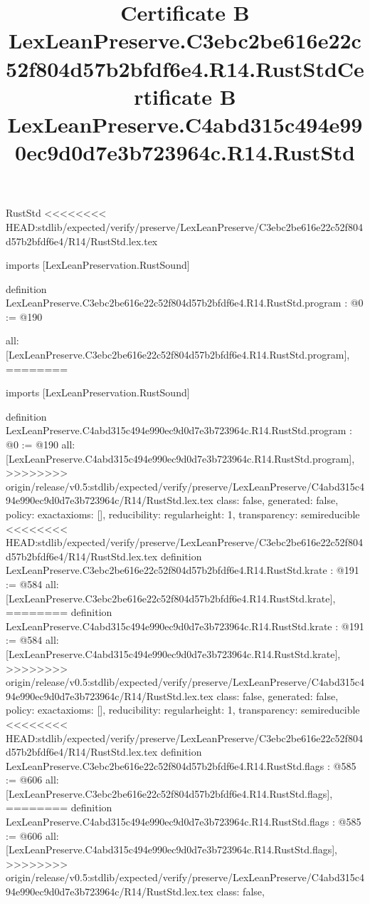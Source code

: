 \begin{lexlean}{RustStd}
<<<<<<<< HEAD:stdlib/expected/verify/preserve/LexLeanPreserve/C3ebc2be616e22c52f804d57b2bfdf6e4/R14/RustStd.lex.tex
\title{Certificate B LexLeanPreserve.C3ebc2be616e22c52f804d57b2bfdf6e4.R14.RustStd}
\begin{coremodule}
imports [LexLeanPreservation.RustSound]

definition LexLeanPreserve.C3ebc2be616e22c52f804d57b2bfdf6e4.R14.RustStd.program : @0 := @190 {
  all: [LexLeanPreserve.C3ebc2be616e22c52f804d57b2bfdf6e4.R14.RustStd.program],
========
\title{Certificate B LexLeanPreserve.C4abd315c494e990ec9d0d7e3b723964c.R14.RustStd}
\begin{coremodule}
imports [LexLeanPreservation.RustSound]

definition LexLeanPreserve.C4abd315c494e990ec9d0d7e3b723964c.R14.RustStd.program : @0 := @190 {
  all: [LexLeanPreserve.C4abd315c494e990ec9d0d7e3b723964c.R14.RustStd.program],
>>>>>>>> origin/release/v0.5:stdlib/expected/verify/preserve/LexLeanPreserve/C4abd315c494e990ec9d0d7e3b723964c/R14/RustStd.lex.tex
  class: false,
  generated: false,
  policy: exact{axioms: []},
  reducibility: regular{height: 1},
  transparency: semireducible
}
<<<<<<<< HEAD:stdlib/expected/verify/preserve/LexLeanPreserve/C3ebc2be616e22c52f804d57b2bfdf6e4/R14/RustStd.lex.tex
definition LexLeanPreserve.C3ebc2be616e22c52f804d57b2bfdf6e4.R14.RustStd.krate : @191 := @584 {
  all: [LexLeanPreserve.C3ebc2be616e22c52f804d57b2bfdf6e4.R14.RustStd.krate],
========
definition LexLeanPreserve.C4abd315c494e990ec9d0d7e3b723964c.R14.RustStd.krate : @191 := @584 {
  all: [LexLeanPreserve.C4abd315c494e990ec9d0d7e3b723964c.R14.RustStd.krate],
>>>>>>>> origin/release/v0.5:stdlib/expected/verify/preserve/LexLeanPreserve/C4abd315c494e990ec9d0d7e3b723964c/R14/RustStd.lex.tex
  class: false,
  generated: false,
  policy: exact{axioms: []},
  reducibility: regular{height: 1},
  transparency: semireducible
}
<<<<<<<< HEAD:stdlib/expected/verify/preserve/LexLeanPreserve/C3ebc2be616e22c52f804d57b2bfdf6e4/R14/RustStd.lex.tex
definition LexLeanPreserve.C3ebc2be616e22c52f804d57b2bfdf6e4.R14.RustStd.flags : @585 := @606 {
  all: [LexLeanPreserve.C3ebc2be616e22c52f804d57b2bfdf6e4.R14.RustStd.flags],
========
definition LexLeanPreserve.C4abd315c494e990ec9d0d7e3b723964c.R14.RustStd.flags : @585 := @606 {
  all: [LexLeanPreserve.C4abd315c494e990ec9d0d7e3b723964c.R14.RustStd.flags],
>>>>>>>> origin/release/v0.5:stdlib/expected/verify/preserve/LexLeanPreserve/C4abd315c494e990ec9d0d7e3b723964c/R14/RustStd.lex.tex
  class: false,
}}}
\end{coremodule}}
\end{coremodule}
\end{lexlean}
